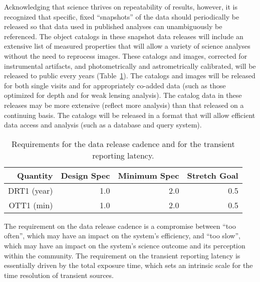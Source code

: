 Acknowledging that science thrives on repeatability of results, however, it
is recognized that specific, fixed ``snapshots'' of the data should
periodically be released so that data used in published analyses can
unambiguously be referenced. The object catalogs in these snapshot data
releases will include an extensive list of measured properties that will
allow a variety of science analyses without the need to reprocess
images. These catalogs and images, corrected for instrumental artifacts,
and photometrically and astrometrically calibrated, will be released to
public every
years (Table~\ref{TDMcadence}). The catalogs and images will be released
for both single visits and for appropriately co-added data (such as those
optimized for depth and for weak lensing analysis). The catalog data in
these releases may be more extensive (\ie reflect more analysis)
than that released on a continuing basis. The catalogs will be released in
a format that will allow efficient data access and analysis (such as a
database and query system).

\begin{table}[h]
\begin{tabular}{|r|r|r|r|}
\hline
     Quantity         &   Design Spec & Minimum Spec  & Stretch Goal   \\
\hline
    DRT1 (year)       &       1.0     &      2.0      &       0.5     \\
    OTT1 (min)        &       1.0     &      2.0      &       0.5     \\
\hline
\end{tabular}
\caption{Requirements for the data release cadence and for the transient
reporting latency.}
\label{TDMcadence}
\end{table}

The requirement on the data release cadence is a compromise between ``too
often'', which may have an impact on the system's efficiency, and ``too
slow'', which may have an impact on the system's science outcome and its
perception within the community.  The requirement on the transient
reporting latency is essentially driven by the total exposure time, which
sets an intrinsic scale for the time resolution of transient sources.

